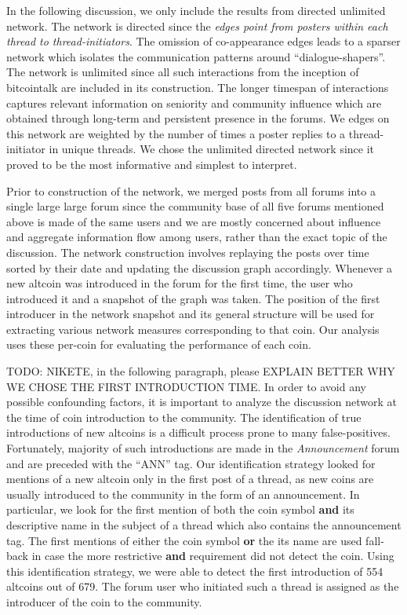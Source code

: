 In the following discussion, we only include the results from directed unlimited network.
The network is directed since the \textit{edges point from posters within each thread to thread-initiators}. The omission
of co-appearance edges leads to a sparser network which isolates the communication
patterns around ``dialogue-shapers''. The network is unlimited since all such interactions
from the inception of bitcointalk are included in its construction. The longer timespan
of interactions captures relevant information on seniority and community influence 
which are obtained through long-term and persistent presence in the forums.
We edges on this network are weighted by the number of times a poster replies
to a thread-initiator in unique threads. We chose the unlimited directed network
since it proved to be the most informative and simplest to interpret.

Prior to construction of the network, we merged posts from all forums into a
single large large forum since the community base of all five forums mentioned
above is made of the same users and we are mostly concerned about influence and
aggregate information flow among users, rather than the exact topic of the discussion.
The network construction involves replaying the posts over time sorted by their date and updating the
discussion graph accordingly. Whenever a new altcoin was introduced
in the forum for the first time, the user who introduced it and a snapshot of the graph was taken.
The position of the first introducer in the network snapshot and its general structure 
will be used for extracting various network measures corresponding to that coin. Our analysis
uses these per-coin for evaluating the performance of each coin.

TODO: NIKETE, in the following paragraph, please EXPLAIN BETTER WHY WE CHOSE THE FIRST INTRODUCTION TIME.
In order to avoid any possible confounding factors, it is important to analyze
the discussion network at the time of coin introduction to the community. The
identification of true introductions of new altcoins is a difficult process
prone to many false-positives. Fortunately, majority of such introductions are
made in the \textit{Announcement} forum and are preceded with the ``ANN'' tag.
Our identification strategy looked for mentions of a new altcoin only in the
first post of a thread, as new coins are usually introduced to the community in
the form of an announcement.  In particular, we look for the first mention of
both the coin symbol \textbf{and} its descriptive name in the subject of a
thread which also contains the announcement tag. The first mentions of either
the coin symbol \textbf{or} the its name are used fall-back in case the more
restrictive \textbf{and} requirement did not detect the coin.  Using this
identification strategy, we were able to detect the first introduction of 554 altcoins
out of 679. The forum user who initiated such a thread is assigned as the 
introducer of the coin to the community.


